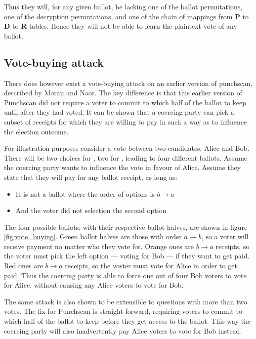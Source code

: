 Thus they will, for any given ballot, be lacking one of the ballot
permutations, one of the decryption permutations, and one of the chain of
mappings from \textbf{P} to \textbf{D} to \textbf{R} tables. Hence they will not be
able to learn the plaintext vote of any ballot.

\subsection{Vote-buying attack}

There does however exist a vote-buying attack on an earlier version of
punchscan, described by Moran and
Naor\autocite{moranSplitballotVotingEverlasting2010}. The key difference is
that this earlier version of Punchscan did not require a voter to commit to
which half of the ballot to keep until after they had voted. It can be shown
that a coercing party can pick a subset of receipts for which they are willing
to pay in such a way as to influence the election outcome.

For illustration purposes consider a vote between two candidates, Alice and
Bob. There will be two choices for \ptop{}, two for \pbottom{}, leading to four
different ballots. Assume the coercing party wants to influence the vote in
favour of Alice. Assume they state that they will pay for any ballot receipt,
as long as:
\begin{itemize}
\item It is not a ballot where the order of options is $b \rightarrow a$
\item And the voter did not selection the second option
\end{itemize}

The four possible ballots, with their respective ballot halves, are shown in
figure \ref{fig:vote_buying}. Green ballot halves are those with order $a
\rightarrow b$, so a voter will receive payment no matter who they vote for.
Orange ones are $b \rightarrow a$ receipts, so the voter must pick the left
option --- voting for Bob --- if they want to get paid. Red ones are $b
\rightarrow a$ receipts, so the voster must vote for Alice in order to get paid.
Thus the coercing party is able to force one out of four Bob voters to vote for
Alice, without causing any Alice voters to vote for Bob.

The same attack is also shown to be extensible to questions with more than two
votes. The fix for Punchscan is straight-forward, requiring voters to commit to
which half of the ballot to keep before they get access to the ballot. This way
the coercing party will also inadvertently pay Alice voters to vote for Bob
instead.

